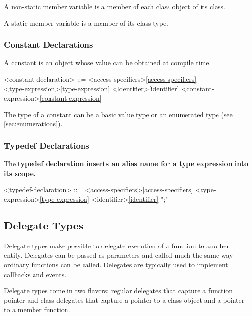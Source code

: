 \documentclass[a4paper,oneside,11pt]{article}
\begin{document}
A non-static member variable is a member of each class object of its class.

A static member variable is a member of its class type.

\subsubsection{Constant Declarations}

A constant is an object whose value can be obtained at compile time.

\begin{grammar}
\label{constant-declaration}<constant-declaration> ::= <access-specifiers>\ref{access-specifiers}\\
 <type-expression>\ref{type-expression} <identifier>\ref{identifier} \lit*{=} <constant-expression>\ref{constant-expression} \lit*{;}

\end{grammar}

The type of a constant can be a basic value type or an enumerated type (see \ref{sec:enumerations}).

\subsubsection{Typedef Declarations}

The \bf{typedef} declaration inserts an alias name for a type expression into its scope.

\begin{grammar}
\label{typedef-declaration}<typedef-declaration> ::= <access-specifiers>\ref{access-specifiers}  <type-expression>\ref{type-expression} <identifier>\ref{identifier} ";"
\end{grammar}

\subsection{Delegate Types}

Delegate types make possible to delegate execution of a function to another entity.
Delegates can be passed as parameters and called much the same way ordinary functions can be called.
Delegates are typically used to implement callbacks and events.

Delegate types come in two flavors: regular delegates that capture a function pointer and
class delegates that capture a pointer to a class object and a pointer to a member function.
\end{document}
